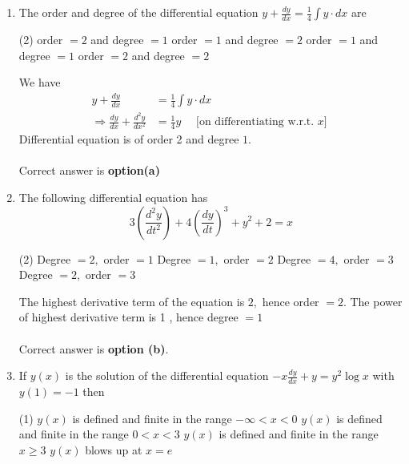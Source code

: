 \begin{enumerate}[label=\color{ocre}\textbf{\arabic*.}]
	\item The order and degree of the differential equation $y+\frac{d y}{d x}=\frac{1}{4} \int y \cdot d x$ are
	
	\begin{tasks}(2)
		\task[\textbf{a.}]order $=2$ and degree $=1$ 
		\task[\textbf{b.}]order $=1$ and degree $=2$
		\task[\textbf{c.}]order $=1$ and degree $=1$ 
		\task[\textbf{d.}]order $=2$ and degree $=2$ 
	\end{tasks}
	\begin{answer}
		We have
		\begin{align*}
		y+\frac{d y}{d x}&=\frac{1}{4} \int y \cdot d x \\
		\Rightarrow \frac{d y}{d x}+\frac{d^{2} y}{d x^{2}}&=\frac{1}{4} y \quad \text { [on  differentiating w.r.t. $x$] }
		\end{align*}
		Differential equation is of order 2 and degree $1 .$\\\\
		Correct answer is \textbf{option(a)}
	\end{answer}
	\item The following differential equation has
	$$
	3\left(\frac{d^{2} y}{d t^{2}}\right)+4\left(\frac{d y}{d t}\right)^{3}+y^{2}+2=x
	$$
	\begin{tasks}(2)
		\task[\textbf{a.}]Degree $=2,$ order $=1$  
		\task[\textbf{b.}]Degree $=1,$ order $=2$
		\task[\textbf{c.}]Degree $=4,$ order $=3$ 
		\task[\textbf{d.}]Degree $=2,$ order $=3$ 
	\end{tasks}
	\begin{answer}
		The highest derivative term of the equation is $2,$ hence order $=2$. The power of highest derivative term is 1 , hence degree $=1$
		\\\\	Correct answer is \textbf{option (b)}.
	\end{answer}
	\item  If $y(x)$ is the solution of the differential equation $-x \frac{d y}{d x}+y=y^{2} \log x$ with $y(1)=-1$
	then\begin{tasks}(1)
		\task[\textbf{a.}] $y(x)$ is defined and finite in the range $-\infty<x<0$ 
		\task[\textbf{b.}]$y(x)$ is defined and finite in the range $0<x<3$
		\task[\textbf{c.}] $y(x)$ is defined and finite in the range $x \geq 3$
		\task[\textbf{d.}]  $y(x)$ blows up at $x=e$
	\end{tasks}
	\begin{answer}

\end{answer}
\end{enumerate}
